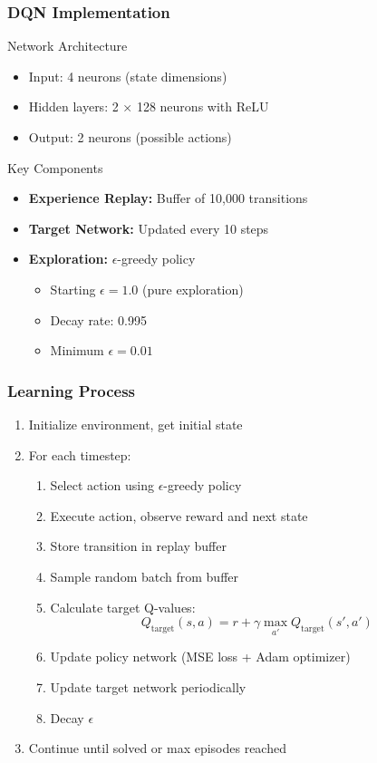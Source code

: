 \documentclass[
    9pt,
    aspectratio=169,
]{beamer}
\begin{document}
\begin{frame}
\frametitle{DQN Implementation}
\begin{block}{Network Architecture}
    \begin{itemize}
        \item Input: 4 neurons (state dimensions)
        \item Hidden layers: 2 × 128 neurons with ReLU
        \item Output: 2 neurons (possible actions)
    \end{itemize}
\end{block}

\begin{block}{Key Components}
    \begin{itemize}
        \item \textbf{Experience Replay:} Buffer of 10,000 transitions
        \item \textbf{Target Network:} Updated every 10 steps
        \item \textbf{Exploration:} $\epsilon$-greedy policy
        \begin{itemize}
            \item Starting $\epsilon = 1.0$ (pure exploration)
            \item Decay rate: 0.995
            \item Minimum $\epsilon = 0.01$
        \end{itemize}
    \end{itemize}
\end{block}
\end{frame}

\begin{frame}
\frametitle{Learning Process}
\begin{enumerate}
    \item Initialize environment, get initial state
    \item For each timestep:
    \begin{enumerate}
        \item Select action using $\epsilon$-greedy policy
        \item Execute action, observe reward and next state
        \item Store transition in replay buffer
        \item Sample random batch from buffer
        \item Calculate target Q-values:
        \begin{equation}
            Q_{\text{target}}(s,a) = r + \gamma \max_{a'} Q_{\text{target}}(s',a')
        \end{equation}
        \item Update policy network (MSE loss + Adam optimizer)
        \item Update target network periodically
        \item Decay $\epsilon$
    \end{enumerate}
    \item Continue until solved or max episodes reached
\end{enumerate}
\end{frame}
\end{document}
